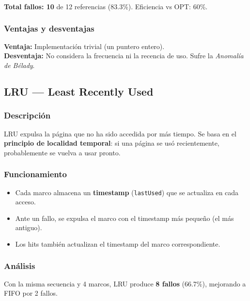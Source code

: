 \documentclass[12pt, a4paper]{article}
\begin{document}
\textbf{Total fallos: 10} de 12 referencias (83.3\%). Eficiencia vs OPT: 60\%.

\subsubsection{Ventajas y desventajas}

\begin{infobox}[title={FIFO}]
\textbf{Ventaja:} Implementación trivial (un puntero entero). \\
\textbf{Desventaja:} No considera la frecuencia ni la recencia de uso. Sufre la \textit{Anomalía de Bélady}.
\end{infobox}

\subsection{LRU — Least Recently Used}

\subsubsection{Descripción}

LRU expulsa la página que no ha sido accedida por más tiempo. Se basa en el \textbf{principio de localidad temporal}: si una página se usó recientemente, probablemente se vuelva a usar pronto.

\subsubsection{Funcionamiento}

\begin{itemize}
  \item Cada marco almacena un \textbf{timestamp} (\texttt{lastUsed}) que se actualiza en cada acceso.
  \item Ante un fallo, se expulsa el marco con el timestamp más pequeño (el más antiguo).
  \item Los hits también actualizan el timestamp del marco correspondiente.
\end{itemize}

\subsubsection{Análisis}

Con la misma secuencia y 4 marcos, LRU produce \textbf{8 fallos} (66.7\%), mejorando a FIFO por 2 fallos.
\end{document}
